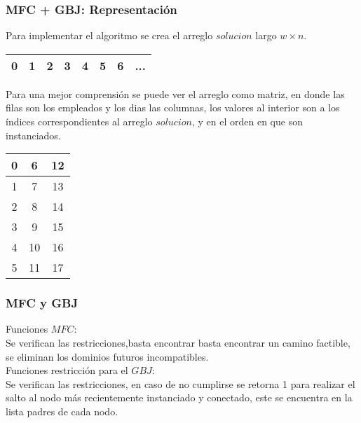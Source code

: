 \frame
{
\frametitle{MFC + GBJ: Representación}
Para implementar el algoritmo se crea el arreglo $solucion$ largo $w \times n$.\\
\begin{table}[H]
\begin{center}
\begin{tabular}{|c|c|c|c|c|c|c|c|}
\hline  0& 1 & 2&3&4&5&6&...  \\ 
\hline 
\end{tabular} 
\end{center}
\end{table}

Para una mejor comprensión se puede ver el arreglo como matriz, en donde las filas son los empleados y los dias las columnas, los valores al interior 
son a los índices correspondientes al arreglo $solucion$, y en el orden en que son instanciados.
\begin{table}[H]
\begin{center}
\begin{tabular}{|c|c|c|}
\hline  0& 6 & 12  \\ 
\hline  1& 7& 13 \\ 
\hline  2& 8 & 14  \\ 
\hline  3&9 & 15\\ 
\hline  4& 10 & 16  \\ 
\hline  5& 11& 17  \\ 
\hline 
\end{tabular} 
\end{center}
\end{table}
}
\frame
{
\frametitle{MFC y GBJ}
Funciones $MFC$:\\
Se verifican las restricciones,basta encontrar basta encontrar un camino factible, se eliminan los dominios futuros incompatibles.\\ \vspace{14 pt}
Funciones restricción para el $GBJ$:\\
Se verifican las restricciones, en caso de no cumplirse se retorna 1 para realizar el salto al nodo más recientemente instanciado y conectado, este se encuentra en la lista padres de cada nodo.\\

}

